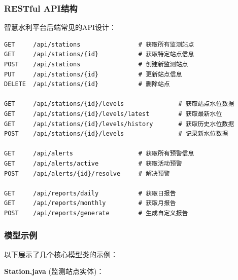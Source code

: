 \subsubsection{RESTful API结构}\label{restful-apiux7ed3ux6784}

智慧水利平台后端常见的API设计：

\begin{lstlisting}
GET     /api/stations                # 获取所有监测站点
GET     /api/stations/{id}           # 获取特定站点信息
POST    /api/stations                # 创建新监测站点
PUT     /api/stations/{id}           # 更新站点信息
DELETE  /api/stations/{id}           # 删除站点

GET     /api/stations/{id}/levels               # 获取站点水位数据
GET     /api/stations/{id}/levels/latest        # 获取最新水位
GET     /api/stations/{id}/levels/history       # 获取历史水位数据
POST    /api/stations/{id}/levels               # 记录新水位数据

GET     /api/alerts                  # 获取所有预警信息
GET     /api/alerts/active           # 获取活动预警
POST    /api/alerts/{id}/resolve     # 解决预警

GET     /api/reports/daily           # 获取日报告
GET     /api/reports/monthly         # 获取月报告
POST    /api/reports/generate        # 生成自定义报告
\end{lstlisting}

\subsubsection{模型示例}\label{ux6a21ux578bux793aux4f8b}

以下展示了几个核心模型类的示例：

\textbf{Station.java} (监测站点实体)：

